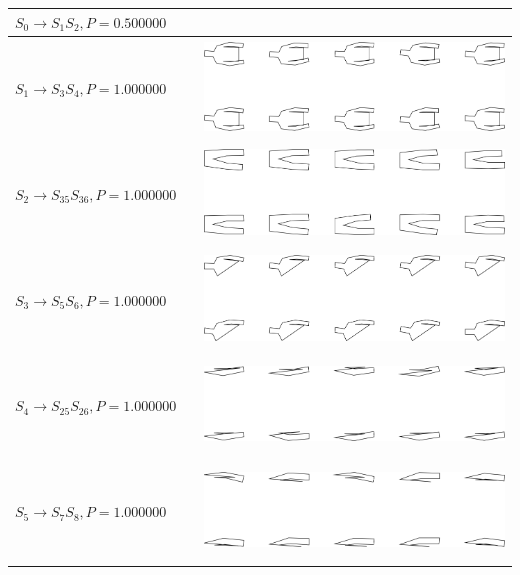 \begin{tabular}{|l|c|c|}
\hline
$S_{0} \to S_{1} S_{2}, P=0.500000$ &  & \\
\hline
$S_{1} \to S_{3} S_{4}, P=1.000000$ &  & \includegraphics[height=1in]{output/1.models/hand_built/romerchoice/gram.0001.sample.png} \\
\hline
$S_{2} \to S_{35} S_{36}, P=1.000000$ &  & \includegraphics[height=1in]{output/1.models/hand_built/romerchoice/gram.0002.sample.png} \\
\hline
$S_{3} \to S_{5} S_{6}, P=1.000000$ &  & \includegraphics[height=1in]{output/1.models/hand_built/romerchoice/gram.0003.sample.png} \\
\hline
$S_{4} \to S_{25} S_{26}, P=1.000000$ &  & \includegraphics[height=1in]{output/1.models/hand_built/romerchoice/gram.0004.sample.png} \\
\hline
$S_{5} \to S_{7} S_{8}, P=1.000000$ &  & \includegraphics[height=1in]{output/1.models/hand_built/romerchoice/gram.0005.sample.png} \\
\hline
\end{tabular}

